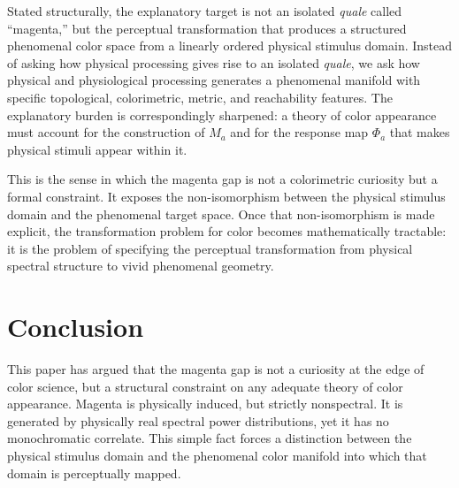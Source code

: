 \documentclass[preprint,12pt,authoryear]{elsarticle}
\theoremstyle{plain}
\theoremstyle{definition}
\theoremstyle{remark}
\begin{document}
\noindent Stated structurally, the explanatory target is not an isolated \textit{quale} called ``magenta,'' but the perceptual transformation that produces a structured phenomenal color space from a linearly ordered physical stimulus domain. Instead of asking how physical processing gives rise to an isolated \textit{quale}, we ask how physical and physiological processing generates a phenomenal manifold with specific topological, colorimetric, metric, and reachability features. The explanatory burden is correspondingly sharpened: a theory of color appearance must account for the construction of $M_a$ and for the response map $\Phi_a$ that makes physical stimuli appear within it.

This is the sense in which the magenta gap is not a colorimetric curiosity but a formal constraint. It exposes the non-isomorphism between the physical stimulus domain and the phenomenal target space. Once that non-isomorphism is made explicit, the transformation problem for color becomes mathematically tractable: it is the problem of specifying the perceptual transformation from physical spectral structure to vivid phenomenal geometry.


\section{Conclusion}
\label{sec:conclusion}

\noindent This paper has argued that the magenta gap is not a curiosity at the edge of color science, but a structural constraint on any adequate theory of color appearance. Magenta is physically induced, but strictly nonspectral. It is generated by physically real spectral power distributions, yet it has no monochromatic correlate. This simple fact forces a distinction between the physical stimulus domain and the phenomenal color manifold into which that domain is perceptually mapped.
\end{document}
